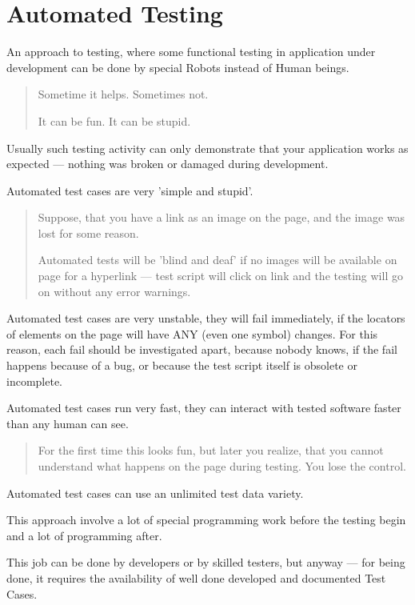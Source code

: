 \section{Automated Testing}
\label{sec:Automated Testing}

An approach to testing, where some functional testing in application under development can be done by special Robots instead of Human beings.

\begin{quote}
Sometime it helps. Sometimes not.

It can be fun. It can be stupid.\end{quote} 

Usually such testing activity can only demonstrate that your application works as expected — nothing was broken or damaged during development.

Automated test cases are very 'simple and stupid'.

\begin{quote}
Suppose, that you have a link as an image on the page, and the image was lost for some reason.

Automated tests will be 'blind and deaf' if no images will be available on page for a hyperlink — test script will click on link and the testing will go on without any error warnings.\end{quote} 

Automated test cases are very unstable, they will fail immediately, if the locators of elements on the page will have ANY (even one symbol) changes. For this reason, each fail should be investigated apart, because nobody knows, if the fail happens because of a bug, or because the test script itself is obsolete or incomplete.

Automated test cases run very fast, they can interact with tested software faster than any human can see.

\begin{quote}
For the first time this looks fun, but later you realize, that you cannot understand what happens on the page during testing. You lose the control.
\end{quote} 

Automated test cases can use an unlimited test data variety.

This approach involve a lot of special programming work before the testing begin and a lot of programming after.

This job can be done by developers or by skilled testers, but anyway — for being done, it requires the availability of well done developed and documented Test Cases.


